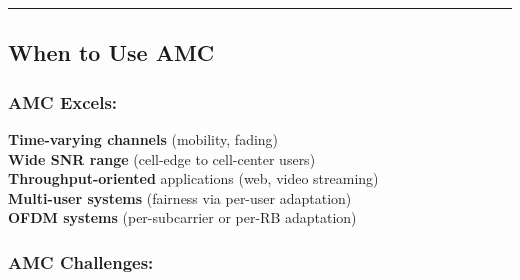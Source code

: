 \begin{Shaded}
\begin{Highlighting}[]
\NormalTok{(}\SpecialCharTok{\{}\SpecialCharTok{\}}\NormalTok{)}
\NormalTok{(}\SpecialCharTok{\{}\NormalTok{)}
\NormalTok{(}\SpecialCharTok{\{}\NormalTok{)}
\NormalTok{(}\SpecialCharTok{\{}\OperatorTok{/}\NormalTok{)}
\NormalTok{(}\SpecialCharTok{\{}\NormalTok{)}
\end{Highlighting}
\end{Shaded}

\begin{center}\rule{0.5\linewidth}{0.5pt}\end{center}

\subsection{When to Use AMC}\label{when-to-use-amc}

\subsubsection{AMC Excels:}\label{amc-excels}

\textbf{Time-varying channels} (mobility, fading)\\
\textbf{Wide SNR range} (cell-edge to cell-center users)\\
\textbf{Throughput-oriented} applications (web, video streaming)\\
\textbf{Multi-user systems} (fairness via per-user adaptation)\\
\textbf{OFDM systems} (per-subcarrier or per-RB adaptation)

\subsubsection{AMC Challenges:}\label{amc-challenges}

